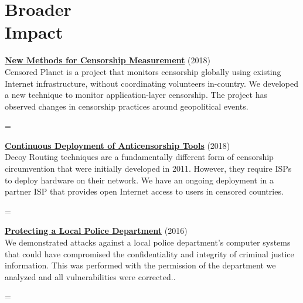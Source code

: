 \documentclass[margin,11pt]{res} %
\newenvironment{absolutelynopagebreak}
  {\par\nobreak\vfil\penalty0\vfilneg
   \vtop\bgroup}
  {\par\xdef\tpd{\the\prevdepth}\egroup
   \prevdepth=\tpd}
\begin{document}
{{{{{{{{{%


\vspace{6pt}
\section{\large Broader\\Impact}

\begin{samepage}
\begin{absolutelynopagebreak}
\textbf{\href{https://censoredplanet.com}{New Methods for Censorship Measurement}} (2018)\\
Censored Planet is a project that monitors censorship globally using existing Internet infrastructure, without coordinating volunteers in-country. We developed a new technique to monitor application-layer censorship. The project has observed changes in censorship practices around geopolitical events.
\end{absolutelynopagebreak}
\end{samepage}

\begin{samepage}
\begin{absolutelynopagebreak}
\textbf{\href{https://refraction.networking}{Continuous Deployment of Anticensorship Tools}} (2018)\\
Decoy Routing techniques are a fundamentally different form of censorship circumvention that were initially developed in 2011. However, they require ISPs to deploy hardware on their network. We have an ongoing deployment in a partner ISP that provides open Internet access to users in censored countries.
\end{absolutelynopagebreak}
\end{samepage}

\begin{samepage}
\begin{absolutelynopagebreak}
\textbf{\href{https://benvds.com/papers/police.pdf}{Protecting a Local Police Department}} (2016)\\
We demonstrated attacks against a local police department's computer systems that could have compromised the confidentiality and integrity of criminal justice information. This was performed with the permission of the department we analyzed and all vulnerabilities were corrected..
\end{absolutelynopagebreak}
\end{samepage}


}}}}}}}}}
\end{document}
